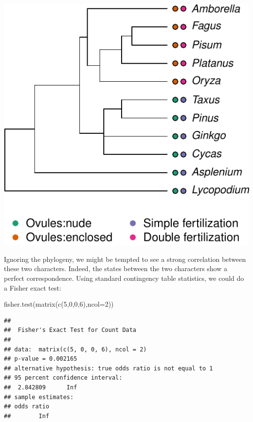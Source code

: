 \documentclass[
]{book}
\newenvironment{Shaded}{\begin{snugshade}}{\end{snugshade}}
\newcommand{\AttributeTok}[1]{\textcolor[rgb]{0.77,0.63,0.00}{#1}}
\newcommand{\DecValTok}[1]{\textcolor[rgb]{0.00,0.00,0.81}{#1}}
\newcommand{\FunctionTok}[1]{\textcolor[rgb]{0.00,0.00,0.00}{#1}}
\newcommand{\NormalTok}[1]{#1}
\begin{document}
\begin{center}\includegraphics{bookdown-demo_files/figure-latex/AngiospermsWithCharacters-1} \end{center}

Ignoring the phylogeny, we might be tempted to see a strong correlation between these two characters. Indeed, the states between the two characters show a perfect correspondence. Using standard contingency table statistics, we could do a Fisher exact test:

\begin{Shaded}
\begin{Highlighting}[]
\FunctionTok{fisher.test}\NormalTok{(}\FunctionTok{matrix}\NormalTok{(}\FunctionTok{c}\NormalTok{(}\DecValTok{5}\NormalTok{,}\DecValTok{0}\NormalTok{,}\DecValTok{0}\NormalTok{,}\DecValTok{6}\NormalTok{),}\AttributeTok{ncol=}\DecValTok{2}\NormalTok{))}
\end{Highlighting}
\end{Shaded}

\begin{verbatim}
## 
##  Fisher's Exact Test for Count Data
## 
## data:  matrix(c(5, 0, 0, 6), ncol = 2)
## p-value = 0.002165
## alternative hypothesis: true odds ratio is not equal to 1
## 95 percent confidence interval:
##  2.842809      Inf
## sample estimates:
## odds ratio 
##        Inf
\end{verbatim}
\end{document}
